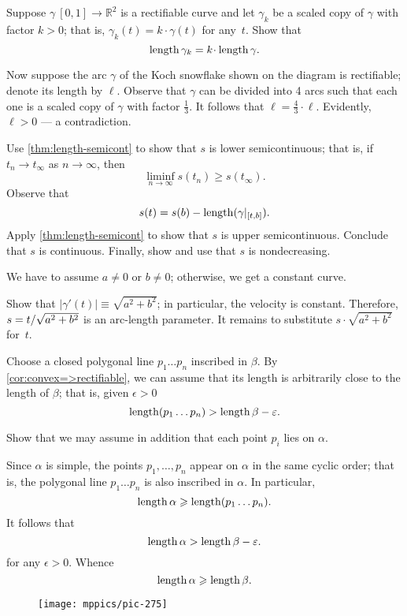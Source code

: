 \begin{multicols}{2}
Suppose $\gamma\:[0,1]\to\mathbb{R}^2$ is a rectifiable curve and let $\gamma_k$ be a scaled copy of $\gamma$ with factor $k>0$;
that is, $\gamma_k(t)=k\cdot\gamma(t)$ for any~$t$.
Show that 
\[\length\gamma_k=k\cdot\length \gamma.\]

Now suppose the arc $\gamma$ of the Koch snowflake shown on the diagram is rectifiable; denote its length by $\ell$.
Observe that $\gamma$ can be divided into 4 arcs such that each one is a scaled copy of $\gamma$ with factor $\tfrac13$.
It follows that $\ell=\tfrac43\cdot\ell$.
Evidently, $\ell>0$ --- a contradiction.

Use \ref{thm:length-semicont} to show that $s$ is lower semicontinuous;
that is, if $t_n\to t_\infty$ as $n\to\infty$, then 
\[\liminf_{n\to\infty} s(t_n)\ge s(t_\infty).\]
Observe that
\[s(t)=s(b)-\mathop{\rm length}\nolimits(\gamma|_{[t,b]}).\]
Apply \ref{thm:length-semicont} to show that $s$ is upper semicontinuous.
Conclude that $s$ is continuous.
Finally, show and use that $s$ is nondecreasing.

We have to assume $a\ne 0$ or $b\ne0$;
otherwise, we get a constant curve.

Show that $|\gamma'(t)|\equiv \sqrt{a^2+b^2}$;
in particular, the velocity is constant.
Therefore, $s\z=t/\sqrt{a^2+b^2}$ is an arc-length parameter.
It remains to substitute $s\cdot \sqrt{a^2+b^2}$ for~$t$.




Choose a closed polygonal line $p_1\dots p_n$ inscribed in $\beta$.
By \ref{cor:convex=>rectifiable}, we can assume that its length is arbitrarily close to the length of $\beta$;
that is, given $\epsilon>0$ 
\[\mathop{\rm length}\nolimits (p_1\dots p_n)>\mathop{\rm length}\nolimits\beta-\varepsilon.\]

Show that we may assume in addition that each point $p_i$ lies on $\alpha$.

Since $\alpha$ is simple, the points $p_1,\dots,p_n$ appear on $\alpha$ in the same cyclic order;
that is, the polygonal line $p_1\dots p_n$ is also inscribed in $\alpha$.
In particular,
\[\mathop{\rm length}\nolimits\alpha\geqslant \mathop{\rm length}\nolimits (p_1\dots p_n).\]
It follows that 
\[\mathop{\rm length}\nolimits\alpha>\mathop{\rm length}\nolimits\beta-\varepsilon.\]
for any $\epsilon>0$.
Whence 
\[\mathop{\rm length}\nolimits\alpha\geqslant\mathop{\rm length}\nolimits\beta.\]

\begin{wrapfigure}{r}{25 mm}
\vskip-6mm
\centering
\texttt{[image: mppics/pic-275]}
\vskip0mm
\end{wrapfigure}


\end{multicols}
